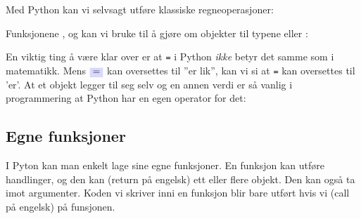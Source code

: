 Med Python kan vi selvsagt utføre klassiske regneoperasjoner:\regv

 \vsk

Funksjonene ,  og  kan vi bruke til å gjøre om objekter til typene  eller : 
 \vsk

En viktig ting å være klar over er at \texttt{=} i Python \textsl{ikke} betyr det samme som \sym{$ = $} i matematikk. Mens $ \sym{=} $ kan oversettes til ''er lik'', kan vi si at \texttt{=} kan oversettes til 'er'.
 \vsk
At et objekt legger til seg selv og en annen verdi er så vanlig i programmering at Python har en egen operator for det:
\newpage
\subsection{Egne funksjoner}
I Pyton  kan man enkelt lage sine egne funksjoner. En funksjon kan utføre handlinger, og den kan  (return på engelsk) ett eller flere objekt. Den kan også ta imot argumenter. Koden vi skriver inni en funksjon blir bare utført hvis vi  (call på engelsk) på funsjonen.


